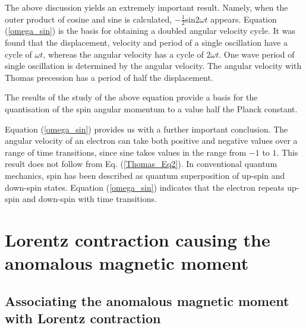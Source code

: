 \documentclass[%
 reprint,
 amsmath,amssymb,
 aps,
]{revtex4-1}
\numberwithin{equation}{section}%
\begin{document}
The above discussion yields an extremely important result. Namely, when the outer product of cosine and sine is calculated, $-\frac{1}{2}$sin$2\omega t$ appears. Equation (\ref{omega_sin}) is the basis for obtaining a doubled angular velocity cycle. It was found that the displacement, velocity and period of a single oscillation have a cycle of $\omega t$, whereas the angular velocity has a cycle of $2\omega t$. One wave period of single oscillation is determined by the angular velocity. The angular velocity with Thomas precession has a period of half the displacement.

The results of the study of the above equation provide a basis for the quantisation of the spin angular momentum to a value half the Planck constant.



Equation (\ref{omega_sin}) provides us with a further important conclusion. The angular velocity of an electron can take both positive and negative values over a range of time transitions, since sine takes values in the range from $-1$ to $1$. This result does not follow from Eq. (\ref{Thomas_Eq2}). In conventional quantum mechanics, spin has been described as quantum superposition of up-spin and down-spin states. Equation (\ref{omega_sin}) indicates that the electron repeats up-spin and down-spin with time transitions.

\section{Lorentz contraction causing the anomalous magnetic moment}

\subsection{Associating the anomalous magnetic moment with Lorentz contraction}

\end{document}

